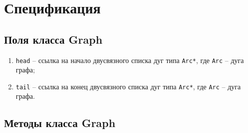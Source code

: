 \section{Спецификация}\label{sec:specification}


\subsection{Поля класса Graph}\label{subsec:fileds}


\begin{enumerate}
    \item \texttt{head} -- ссылка на начало двусвязного списка дуг типа \texttt{Arc*}, где \texttt{Arc} -- дуга графа;
    \item \texttt{tail} -- ссылка на конец двусвязного списка дуг типа \texttt{Arc*}, где \texttt{Arc} -- дуга графа.
\end{enumerate}


\subsection{Методы класса Graph}\label{subsec:methods}


